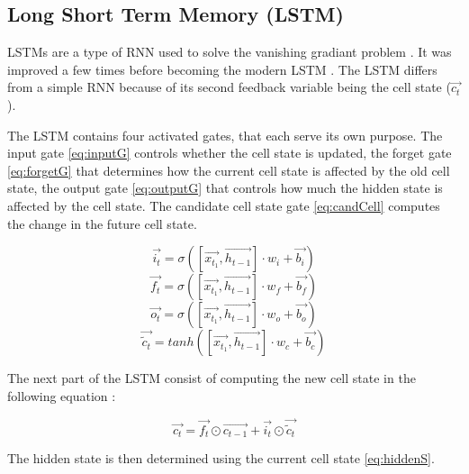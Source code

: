 \subsection{Long Short Term Memory (LSTM)}

LSTMs are a type of RNN used to solve the vanishing gradiant problem \cite{firstLSTM}. It was improved a few times before becoming the modern LSTM \cite{improvLSTM}. The LSTM differs from a simple RNN because of its second feedback variable being the cell state ($\overrightarrow{c_t}$).

The LSTM contains four activated gates, that each serve its own purpose. The input gate \cref{eq:inputG} controls whether the cell state is updated, the forget gate \cref{eq:forgetG} that determines how the current cell state is affected by the old cell state, the output gate \cref{eq:outputG} that controls how much the hidden state is affected by the cell state. The candidate cell state gate \cref{eq:candCell} computes the change in the future cell state.

\begin{equation}\label{eq:inputG}
  \overrightarrow{i_t}=\sigma ([\overrightarrow{x_{t_1}},\overrightarrow{h_{t-1}}]\cdot w_i + \overrightarrow{b_i})
\end{equation}
\begin{equation}\label{eq:forgetG}
  \overrightarrow{f_t}=\sigma ([\overrightarrow{x_{t_1}},\overrightarrow{h_{t-1}}]\cdot w_f + \overrightarrow{b_f})
\end{equation}
\begin{equation}\label{eq:outputG}
  \overrightarrow{o_t}=\sigma ([\overrightarrow{x_{t_1}},\overrightarrow{h_{t-1}}]\cdot w_o + \overrightarrow{b_o})
\end{equation}
\begin{equation}\label{eq:candCell}
  \overrightarrow{\tilde{c}_t}=tanh([\overrightarrow{x_{t_1}},\overrightarrow{h_{t-1}}]\cdot w_c+ \overrightarrow{b_c})
\end{equation}

The next part of the LSTM consist of computing the new cell state in the following equation :

\begin{equation}\label{eq:cellS}
  \overrightarrow{c_t}=\overrightarrow{f_t}\odot \overrightarrow{c_{t-1}} + \overrightarrow{i_t} \odot \overrightarrow{\tilde{c}_t}
\end{equation}

The hidden state is then determined using the current cell state \cref{eq:hiddenS}.

